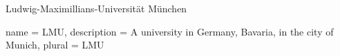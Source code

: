 
{Ludwig-Maximillians-Universität München}

{
  name = LMU,
  description = {A university in Germany, Bavaria, in the city of Munich},
  plural = LMU
}

